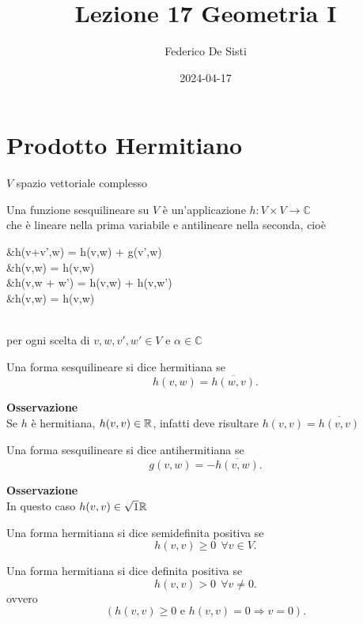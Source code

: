 \documentclass[12px]{article}
\title{Lezione 17 Geometria I}
\date{2024-04-17}
\author{Federico De Sisti}
\begin{document}
	\maketitle
	\newpage
	\section{Prodotto Hermitiano}
	$V$ spazio vettoriale complesso
	\begin{defi}
		Una funzione sesquilineare su $V$ è un'applicazione $h: V\times V \rightarrow \mathbb{C}$\\
		che è lineare nella prima variabile e antilineare nella seconda, cioè\\[10px]
		\begin{aligned}
			\hspace{80px}&h(v+v',w) = h(v,w) + g(v',w)\\
		&h(\alpha v,w) = \alpha h(v,w)\\
		&h(v,w + w') = h(v,w) + h(v,w')\\
			&h(v,\alpha w) = \overline{\alpha}h(v,w)\\
		\end{aligned}\\[10px]
		per ogni scelta di $v,w,v',w'\in V$ e $\alpha \in\mathbb{C}$
	\end{defi}
	\begin{defi}
		Una forma sesquilineare si dice hermitiana se
		\[
			h(v,w) = \overline{h(w,v)}
		.\] 
	\end{defi}
	\textbf{Osservazione}\\
	Se $h$ è hermitiana, $h(v,v)\in\mathbb{R}$, infatti deve risultare $h(v,v) = \overline{h(v,v)}$
	\begin{defi}
		Una forma sesquilineare si dice antihermitiana se 
		\[
			g(v,w) = - \overline{h(v,w)}
		.\] 
	\end{defi}
	\textbf{Osservazione}\\
	In questo caso $h(v,v)\in\sqrt{1}\mathbb{R}$\\
	\begin{defi}
		Una forma hermitiana si dice semidefinita positiva se 
		\[
		h(v,v) \geq 0 \ \ \forall v\in V
		.\] 
	\end{defi}
	\begin{defi}
		Una forma hermitiana si dice definita positiva se 
		\[
		h(v,v)>0 \ \ \forall v \neq 0
		.\] 
		ovvero
		\[
			(h(v,v)\geq 0 \text{ e }h(v,v) = 0 \Rightarrow v=0)
		.\] 
	\end{defi}
\end{document}
